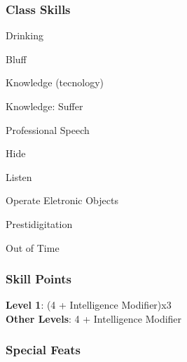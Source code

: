 \documentclass[ letterpaper,12pt]{article}
\begin{document}
\subsubsection{Class Skills}
\begin{itemize}
{\it
\item{Drinking}
\item{Bluff}
\item{Knowledge (tecnology)}
\item{Knowledge: Suffer}
\item{Professional Speech}
\item{Hide}
\item{Listen}
\item{Operate Eletronic Objects}
\item{Prestidigitation}
\item{Out of Time}
}
\end{itemize}

\subsubsection{Skill Points}
{\bf Level 1}: (4 + Intelligence Modifier)x3\\
{\bf Other Levels}: 4 + Intelligence Modifier\\

\subsubsection{Special Feats}
\end{document}
